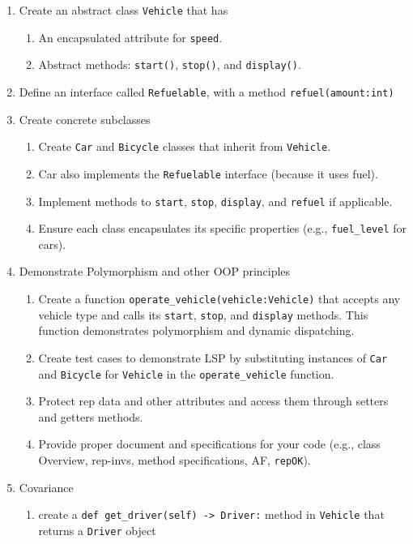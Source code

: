 \documentclass[oneside,11pt,dvipsnames]{book}
\newcommand{\code}[1]{\texttt{#1}}
\begin{document}
\begin{enumerate}
    \item Create an abstract class \code{Vehicle} that has
    \begin{enumerate}
        \item An encapsulated attribute for \code{speed}.
        \item Abstract methods: \code{start()}, \code{stop()}, and \code{display()}.
    \end{enumerate}
    \item Define an interface called \code{Refuelable}, with a method \code{refuel(amount:int)}
    \item Create concrete subclasses
    \begin{enumerate}
	    \item Create \code{Car} and \code{Bicycle} classes that inherit from \code{Vehicle}.
	    \item Car also implements the \code{Refuelable} interface (because it uses fuel).
	    \item Implement methods to \code{start}, \code{stop}, \code{display}, and \code{refuel} if applicable.
	    \item Ensure each class encapsulates its specific properties (e.g., \code{fuel\_level} for cars).
    \end{enumerate}
    \item Demonstrate Polymorphism and other OOP principles
    \begin{enumerate}
        \item Create a function \code{operate\_vehicle(vehicle:Vehicle)} that accepts any vehicle type and calls its \code{start}, \code{stop}, and \code{display} methods. This function demonstrates polymorphism and dynamic dispatching.
        \item Create test cases to demonstrate LSP by substituting instances of \code{Car} and \code{Bicycle} for \code{Vehicle} in the \code{operate\_vehicle} function. 
        \item Protect rep data and other attributes and access them through setters and getters methods.
    \item Provide proper document and specifications for your code (e.g., class Overview, rep-invs, method specifications, AF, \code{repOK}).
    \end{enumerate}
    \item Covariance
    \begin{enumerate}
        \item create a \code{def get\_driver(self) -> Driver:} method in \code{Vehicle} that returns a \code{Driver} object

\end{enumerate}
\end{enumerate}
\end{document}
